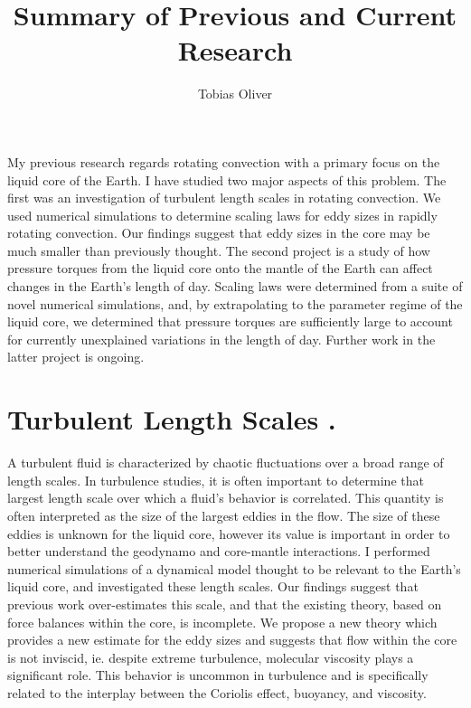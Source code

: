 \documentclass[12pt]{article}
\title{Summary of Previous and Current Research}
\author{Tobias Oliver}
\date{}
\begin{document}
\pagestyle{fancy}
\thispagestyle{fancy}
\fancyhf{} %
\fancyhead[L]{\textcolor{red}{Tobias Oliver\\
Summary of Previous Research}}
\fancyfoot[R]{\thepage}
My previous research regards rotating convection with a primary focus on the liquid core of the Earth. I have studied two major aspects of this problem. The first was an investigation of turbulent length scales in rotating convection. We used numerical simulations to determine scaling laws for eddy sizes in rapidly rotating convection. Our findings suggest that eddy sizes in the core may be much smaller than previously thought. The second project is a study of how pressure torques from the liquid core onto the mantle of the Earth can affect changes in the Earth's length of day. Scaling laws were determined from a suite of novel numerical simulations, and, by extrapolating to the parameter regime of the liquid core, we determined that pressure torques are sufficiently large to account for currently unexplained variations in the length of day. Further work in the latter project is ongoing.
\section*{Turbulent Length Scales \cite{tO23}.}
A turbulent fluid is characterized by chaotic fluctuations over a broad range of length scales. In turbulence studies, it is often important to determine that largest length scale over which a fluid's behavior is correlated. This quantity is often interpreted as the size of the largest eddies in the flow.
The size of these eddies is unknown for the liquid core, however its value is important in order to better understand the geodynamo and core-mantle interactions. I performed numerical simulations of a dynamical model thought to be relevant to the Earth's liquid core, and investigated these length scales. Our findings suggest that previous work over-estimates this scale, and that the existing theory, based on force balances within the core, is incomplete. We propose a new theory which provides a new estimate for the eddy sizes and suggests that flow within the core is not inviscid, ie. despite extreme turbulence, molecular viscosity plays a significant role. This behavior is uncommon in turbulence and is specifically related to the interplay between the Coriolis effect, buoyancy, and viscosity.
\end{document}
